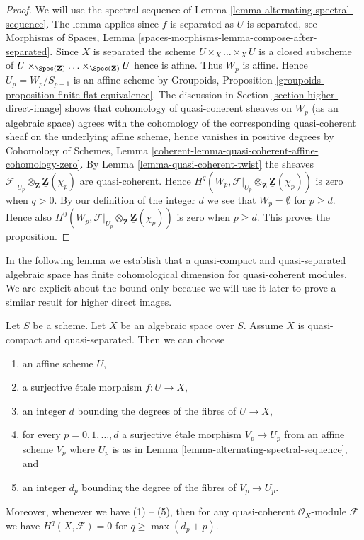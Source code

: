 \begin{proof}
We will use the spectral sequence of
Lemma \ref{lemma-alternating-spectral-sequence}.
The lemma applies since $f$ is separated as $U$ is separated, see
Morphisms of Spaces, Lemma
\ref{spaces-morphisms-lemma-compose-after-separated}.
Since $X$ is separated the scheme $U \times_X \ldots \times_X U$ is a closed
subscheme of
$U \times_{\Spec(\mathbf{Z})} \ldots \times_{\Spec(\mathbf{Z})} U$
hence is affine. Thus $W_p$ is affine. Hence $U_p = W_p/S_{p + 1}$ is an
affine scheme by
Groupoids, Proposition \ref{groupoids-proposition-finite-flat-equivalence}.
The discussion in
Section \ref{section-higher-direct-image}
shows that cohomology of quasi-coherent sheaves on $W_p$ (as an algebraic
space) agrees with the cohomology of the corresponding quasi-coherent
sheaf on the underlying affine scheme, hence vanishes in positive degrees by
Cohomology of Schemes, Lemma
\ref{coherent-lemma-quasi-coherent-affine-cohomology-zero}.
By
Lemma \ref{lemma-quasi-coherent-twist}
the sheaves
$\mathcal{F}|_{U_p} \otimes_\mathbf{Z} \underline{\mathbf{Z}}(\chi_p)$
are quasi-coherent. Hence
$H^q(W_p,
\mathcal{F}|_{U_p} \otimes_\mathbf{Z} \underline{\mathbf{Z}}(\chi_p))$
is zero when $q > 0$. By our definition of the integer $d$ we see that
$W_p = \emptyset$ for $p \geq d$. Hence also
$H^0(W_p,
\mathcal{F}|_{U_p} \otimes_\mathbf{Z} \underline{\mathbf{Z}}(\chi_p))$
is zero when $p \geq d$.
This proves the proposition.
\end{proof}

\noindent
In the following lemma we establish that a quasi-compact and
quasi-separated algebraic space has finite cohomological dimension
for quasi-coherent modules. We are explicit about the bound only because
we will use it later to prove a similar result for higher direct
images.

\begin{lemma}
\label{lemma-vanishing-quasi-separated}
Let $S$ be a scheme. Let $X$ be an algebraic space over $S$.
Assume $X$ is quasi-compact and quasi-separated.
Then we can choose
\begin{enumerate}
\item an affine scheme $U$,
\item a surjective \'etale morphism $f : U \to X$,
\item an integer $d$ bounding the degrees of the fibres of $U \to X$,
\item for every $p = 0, 1, \ldots, d$ a surjective \'etale morphism
$V_p \to U_p$ from an affine scheme $V_p$ where $U_p$ is as in
Lemma \ref{lemma-alternating-spectral-sequence}, and
\item an integer $d_p$ bounding the degree of the fibres of $V_p \to U_p$.
\end{enumerate}
Moreover, whenever we have (1) -- (5), then for any quasi-coherent
$\mathcal{O}_X$-module $\mathcal{F}$ we have $H^q(X, \mathcal{F}) = 0$ for
$q \geq \max(d_p + p)$.
\end{lemma}

